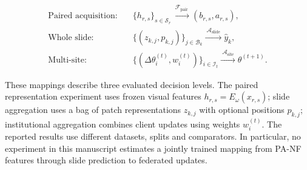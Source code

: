 \begin{equation}
\begin{aligned}
\text{Paired acquisition:}\quad
&\{h_{r,s}\}_{s\in\mathcal S_r}
 \xrightarrow{\ \mathcal F_{\mathrm{pair}}\ }
 (b_{r,s},a_{r,s}),\\
\text{Whole slide:}\quad
&\{(z_{k,j},p_{k,j})\}_{j\in\mathcal B_k}
 \xrightarrow{\ \mathcal A_{\mathrm{slide}}\ }
 \widehat y_k,\\
\text{Multi-site:}\quad
&\{(\Delta\theta_i^{(t)},w_i^{(t)})\}_{i\in\mathcal I_t}
 \xrightarrow{\ \mathcal A_{\mathrm{site}}\ }
 \theta^{(t+1)}.
\end{aligned}
\label{eq:program}
\end{equation}

\noindent These mappings describe three evaluated decision levels. The paired representation experiment uses frozen visual features $h_{r,s}=E_\omega(x_{r,s})$; slide aggregation uses a bag of patch representations $z_{k,j}$ with optional positions $p_{k,j}$; institutional aggregation combines client updates using weights $w_i^{(t)}$. The reported results use different datasets, splits and comparators. In particular, no experiment in this manuscript estimates a jointly trained mapping from PA-NF features through slide prediction to federated updates.
